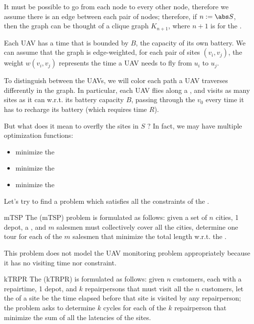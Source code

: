 \documentclass[a4paper, 12pt]{report}
\begin{document}
    It must be possible to go from each node to every other node, therefore we assume there is an edge between each pair of nodes; therefore, if $n := \abs S$, then the graph can be thought of a clique graph $K_{n + 1}$, where $n + 1$ is for the .

    Each UAV has a  time that is bounded by $B$, the capacity of its own battery. We can assume that the graph is edge-weighted, for each pair of sites $(v_i,v_j)$, the weight $w(v_i, v_j)$ represents the time a UAV needs to fly from $u_i$ to $u_j$.

    To distinguish between the UAVs, we will color each path a UAV traverses differently in the graph. In particular, each UAV flies along a , and visits as many sites as it can w.r.t. its battery capacity $B$, passing through the  $v_0$ every time it has to recharge its battery (which requires time $R$).

    But what does it mean to overfly the sites in $S$ ? In fact, we may have multiple optimization functions:

    \begin{itemize}
        \item minimize the 
        \item minimize the 
        \item minimize the 
    \end{itemize}

    Let's try to find a problem which satisfies all the constraints of the .

    \begin{frameddefn}{mTSP}
        The  (mTSP) problem is formulated as follows: given a set of $n$ cities, 1 depot, a , and $m$ salesmen must collectively cover all the cities, determine one tour for each of the $m$ salesmen that minimize the total length w.r.t. the .
    \end{frameddefn}

    This problem does not model the UAV monitoring problem appropriately because it has no visiting time nor  constraint.

    \begin{frameddefn}{kTRPR}
        The  (kTRPR) is formulated as follows: given $n$ customers, each with a repairtime, 1 depot, and $k$ repairpersons that must visit all the $n$ customers, let the  of a site be the time elapsed before that site is visited by any repairperson; the problem asks to determine $k$ cycles for each of the $k$ repairperson that minimize the sum of all the latencies of the sites.
    \end{frameddefn}
\end{document}
